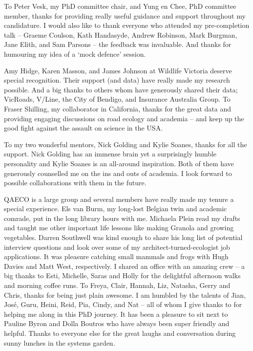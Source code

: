 \documentclass[titlesmallcaps,copyrightpage,examinerscopy]{uomthesis}
\begin{document}
To Peter Vesk, my PhD committee chair, and Yung en Chee, PhD committee member, thanks for providing really useful guidance and support throughout my candidature. I would also like to thank everyone who attended my pre-completion talk -- Graeme Coulson, Kath Handasyde, Andrew Robinson, Mark Burgman, Jane Elith, and Sam Parsons -- the feedback was invaluable. And thanks for humouring my idea of a `mock defence' session.

Amy Hidge, Karen Masson, and James Johnson at Wildlife Victoria deserve special recognition. Their support (and data) have really made my research possible. And a big thanks to others whom have generously shared their data; VicRoads, V/Line, the City of Bendigo, and Insurance Australia Group. To Fraser Shilling, my collaborator in California, thanks for the great data and providing engaging discussions on road ecology and academia -- and keep up the good fight against the assault on science in the USA.

To my two wonderful mentors, Nick Golding and Kylie Soanes, thanks for all the support. Nick Golding has an immense brain yet a surprisingly humble personality and Kylie Soanes is an all-around inspiration. Both of them have generously counselled me on the ins and outs of academia. I look forward to possible collaborations with them in the future.

QAECO is a large group and several members have really made my tenure a special experience. Els van Burm, my long-lost Belgian twin and academic comrade, put in the long library hours with me. Michaela Plein read my drafts and taught me other important life lessons like making Granola and growing vegetables. Darren Southwell was kind enough to share his long list of potential interview questions and look over some of my architect-turned-ecologist job applications. It was pleasure catching small mammals and frogs with Hugh Davies and Matt West, respectively. I shared an office with an amazing crew -- a big thanks to Esti, Michelle, Saras and Holly for the delightful afternoon walks and morning coffee runs. To Freya, Clair, Hannah, Liz, Natasha, Gerry and Chris, thanks for being just plain awesome. I am humbled by the talents of Jian, Jos\'e, Guru, Heini, Reid, Pia, Cindy, and Nat -- all of whom I give thanks to for helping me along in this PhD journey. It has been a pleasure to sit next to Pauline Byron and Dolla Boutros who have always been super friendly and helpful. Thanks to everyone else for the great laughs and conversation during sunny lunches in the systems garden.
\end{document}
